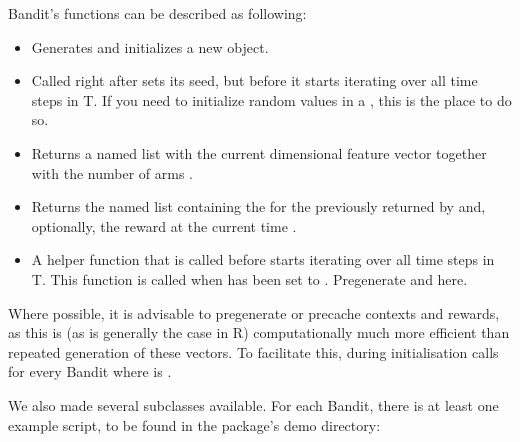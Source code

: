 \documentclass[nojss]{jss}\usepackage[]{graphicx}\usepackage[]{color}
\begin{document}
Bandit's functions can be described as following:

\begin{itemize}
  \item{}{ Generates and initializes a new  object. }
  \item{}{
     Called right after  sets its seed,
     but before it starts iterating over all time steps  in T. If you need to initialize random values in a ,
     this is the place to do so.
  }
  \item{}{
     Returns a named list 
     with the current  dimensional  feature vector  together with the number of arms .
 }
  \item{}{
     Returns the named list  containing the 
     for the  previously returned by  and,
     optionally, the  reward
     at the current time .
 }
  \item{}{
     A helper function that is called before  starts iterating over all time steps  in T.
     This function is called when  has been set to .
     Pregenerate  and  here.
  }
\end{itemize}

Where possible, it is advisable to pregenerate or precache  contexts and rewards, as this is (as is generally the case in R) computationally much more efficient than repeated generation of these vectors. To facilitate this, during initialisation  calls  for every Bandit where  is .

We also made several  subclasses available.  For each Bandit, there is at least one example script, to be found in the package’s demo directory:
\end{document}
